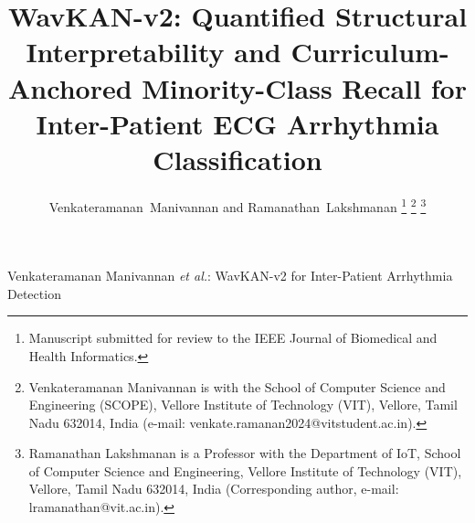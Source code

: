 \documentclass[journal,twoside,web]{ieeecolor}
\begin{document}
\title{\vspace{15mm}WavKAN-v2: Quantified Structural Interpretability and Curriculum-Anchored Minority-Class Recall for Inter-Patient ECG Arrhythmia Classification}

\author{Venkateramanan~Manivannan and Ramanathan~Lakshmanan
\thanks{Manuscript submitted for review to the IEEE Journal of Biomedical and Health Informatics.}
\thanks{Venkateramanan Manivannan is with the School of Computer Science
and Engineering (SCOPE), Vellore Institute of Technology (VIT), Vellore,
Tamil Nadu 632014, India (e-mail: venkate.ramanan2024@vitstudent.ac.in).}
\thanks{Ramanathan Lakshmanan is a Professor with the Department of IoT,
School of Computer Science and Engineering, Vellore Institute of Technology (VIT), Vellore,
Tamil Nadu 632014, India (Corresponding author, e-mail: lramanathan@vit.ac.in).}}

{Venkateramanan Manivannan \MakeLowercase{\textit{et al.}}: WavKAN-v2 for Inter-Patient Arrhythmia Detection}

\maketitle
\end{document}
